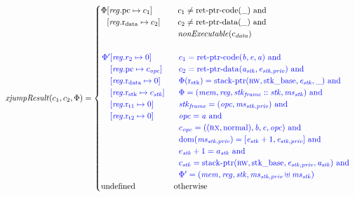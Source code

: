 \documentclass[a4paper]{article}
\begin{document}
\begin{align*}
  \xjumpResult{c_1}{c_2}{\Phi} = 
  \begin{cases}
    \arraycolsep=0pt
    \begin{array}[t]{rl}
      \Phi & \updReg{\pcreg}{c_1}\\
           & \updReg{\rdata}{c_2}
    \end{array} &
    \begin{array}[t]{l}
      c_1 \neq \retptrc(\_) \tand \\
      c_2 \neq \retptrd(\_) \tand \\
      \nonExec{c_\data}
    \end{array}
    \\&\\
    \sourcecolor\left.
      \arraycolsep=0pt
      \begin{array}[t]{rl}
        \Phi' & \updReg{r_2}{0} \\
              & \updReg{\pcreg}{c_\opc}\\
              & \updReg{\rdata}{0}\\
              & \updReg{\rstk}{c_\stk}\\
              & \updReg{\rtmp{1}}{0}\\
              & \updReg{\rtmp{2}}{0}
      \end{array}\right.&
    \sourcecolor\left.
      \begin{array}[t]{l}
        c_1 = \retptrc(\baddr,\eaddr,\aaddr) \tand \\
        c_2 = \retptrd(\aaddr_\stk,\eaddr_{\stk,\priv}) \tand \\
        \Phi(\rstk) = \stkptr{\rw,\stkb,\eaddr_\stk,\_} \tand \\ 
        \Phi = (\mem,\reg,\stkf::\stk,\ms_\stk) \tand \\
        \stkf = (\opc,\ms_{\stk,\priv}) \tand \\
        \opc = \aaddr \tand \\
        c_\opc = ((\rx,\normal),\baddr,\eaddr,\opc) \tand \\
        \dom(\ms_{\stk,\priv}) = [\eaddr_\stk+1,\eaddr_{\stk,\priv}] \tand\\
        e_\stk + 1 = a_\stk \tand\\
        c_\stk = \stkptr{\rw,\stkb,\eaddr_{\stk,\priv},\aaddr_\stk} \tand\\
        \Phi' = (\mem,\reg,\stk,\ms_{\stk,\priv} \uplus \ms_\stk) 
      \end{array}\right.
    \\
    \tundefined & \totherwise
  \end{cases}
\end{align*}
\end{document}
